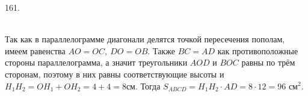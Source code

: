 161. \begin{figure}[ht!]
\end{figure}\\
Так как в параллелограмме диагонали делятся точкой пересечения пополам, имеем равенства $AO=OC,\ DO=OB.$ Также $BC=AD$ как противоположные стороны параллелограмма, а значит треугольники $AOD$ и $BOC$ равны по трём сторонам, поэтому в них равны соответствующие высоты и $H_1H_2=OH_1+OH_2=4+4=8$см. Тогда $S_{ABCD}=H_1H_2\cdot AD=8\cdot12=96\text{ см}^2.$\\
